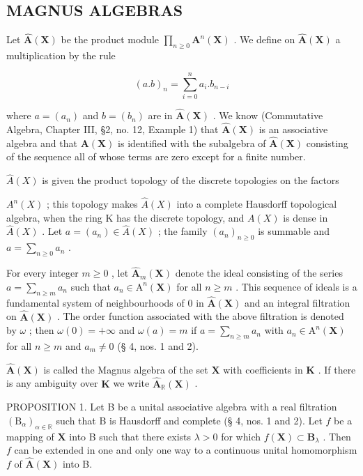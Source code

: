 \subsection{MAGNUS ALGEBRAS}

Let \(\hat{\mathbf{A}}(\mathbf{X})\) be the product module \(\prod_{n\geqslant 0}\mathbf{A}^n (\mathbf{X})\) . We define on \(\hat{\mathbf{A}}(\mathbf{X})\) a multiplication by the rule

\[
(a. b) _ {n} = \sum_ {i = 0} ^ {n} a _ {i}. b _ {n - i}\tag{1}
\]

where \(a = (a_{n})\) and \(b = (b_{n})\) are in \(\hat{\mathbf{A}}(\mathbf{X})\) . We know (Commutative Algebra, Chapter III, §2, no. 12, Example 1) that \(\hat{\mathbf{A}}(\mathbf{X})\) is an associative algebra and that \(\mathbf{A}(\mathbf{X})\) is identified with the subalgebra of \(\hat{\mathbf{A}}(\mathbf{X})\) consisting of the sequence all of whose terms are zero except for a finite number.

\(\hat{A}(X)\) is given the product topology of the discrete topologies on the factors

\(A^{n}(X)\) ; this topology makes \(\hat{A}(X)\) into a complete Hausdorff topological algebra, when the ring K has the discrete topology, and \(A(X)\) is dense in \(\hat{A}(X)\) . Let \(a = (a_{n}) \in \hat{A}(X)\) ; the family \((a_{n})_{n \geqslant 0}\) is summable and \(a = \sum_{n \geqslant 0} a_{n}\) .

For every integer \(m \geqslant 0\) , let \(\hat{\mathbf{A}}_m(\mathbf{X})\) denote the ideal consisting of the series \(a = \sum_{n \geqslant m} a_n\) such that \(a_n \in \mathrm{A}^n(\mathbf{X})\) for all \(n \geqslant m\) . This sequence of ideals is a fundamental system of neighbourhoods of 0 in \(\hat{\mathbf{A}}(\mathbf{X})\) and an integral filtration on \(\hat{\mathbf{A}}(\mathbf{X})\) . The order function associated with the above filtration is denoted by \(\omega\) ; then \(\omega(0) = +\infty\) and \(\omega(a) = m\) if \(a = \sum_{n \geqslant m} a_n\) with \(a_n \in \mathrm{A}^n(\mathbf{X})\) for all \(n \geqslant m\) and \(a_m \neq 0\) (§ 4, nos. 1 and 2).

\(\hat{\mathbf{A}}(\mathbf{X})\) is called the Magnus algebra of the set \(\mathbf{X}\) with coefficients in \(\mathbf{K}\) . If there is any ambiguity over \(\mathbf{K}\) we write \(\hat{\mathbf{A}}_{\mathbb{R}}(\mathbf{X})\) .

PROPOSITION 1. Let B be a unital associative algebra with a real filtration \((\mathrm{B}_{\alpha})_{\alpha \in \mathbb{R}}\) such that B is Hausdorff and complete (§ 4, nos. 1 and 2). Let \(f\) be a mapping of \(\mathbf{X}\) into B such that there exists \(\lambda > 0\) for which \(f(\mathbf{X}) \subset \mathbf{B}_{\lambda}\) . Then \(f\) can be extended in one and only one way to a continuous unital homomorphism \(f\) of \(\hat{\mathbf{A}}(\mathbf{X})\) into B.

